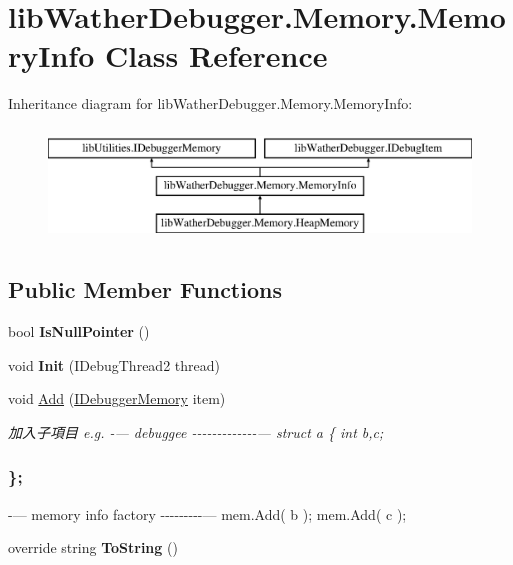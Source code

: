 \hypertarget{classlib_wather_debugger_1_1_memory_1_1_memory_info}{\section{lib\+Wather\+Debugger.\+Memory.\+Memory\+Info Class Reference}
\label{classlib_wather_debugger_1_1_memory_1_1_memory_info}
}
Inheritance diagram for lib\+Wather\+Debugger.\+Memory.\+Memory\+Info\+:\begin{figure}[H]
\begin{center}
\leavevmode
\includegraphics[height=3.000000cm]{classlib_wather_debugger_1_1_memory_1_1_memory_info}
\end{center}
\end{figure}
\subsection*{Public Member Functions}
\begin{DoxyCompactItemize}
\item 
\hypertarget{classlib_wather_debugger_1_1_memory_1_1_memory_info_a1007d1f55b8e9579928724a0fe42f52c}{bool {\bfseries Is\+Null\+Pointer} ()}\label{classlib_wather_debugger_1_1_memory_1_1_memory_info_a1007d1f55b8e9579928724a0fe42f52c}

\item 
\hypertarget{classlib_wather_debugger_1_1_memory_1_1_memory_info_a072a240dfc246a67118fc8d8c061443b}{void {\bfseries Init} (I\+Debug\+Thread2 thread)}\label{classlib_wather_debugger_1_1_memory_1_1_memory_info_a072a240dfc246a67118fc8d8c061443b}

\item 
void \hyperlink{classlib_wather_debugger_1_1_memory_1_1_memory_info_a16fe831b50184b24dccbebf2e4b19288}{Add} (\hyperlink{interfacelib_utilities_1_1_i_debugger_memory}{I\+Debugger\+Memory} item)
\begin{DoxyCompactList}\small\item\em 加入子項目 e.\+g. -\/--- debuggee -\/-\/-\/-\/-\/-\/-\/-\/-\/-\/-\/-\/-\/--- struct a \{ int b,c; \subsubsection*{\}; }

-\/--- memory info factory -\/-\/-\/-\/-\/-\/-\/-\/-\/--- mem.\+Add( b ); mem.\+Add( c ); \end{DoxyCompactList}\item 
\hypertarget{classlib_wather_debugger_1_1_memory_1_1_memory_info_a70a148d400f1cd998df214f125585a36}{override string {\bfseries To\+String} ()}\label{classlib_wather_debugger_1_1_memory_1_1_memory_info_a70a148d400f1cd998df214f125585a36}

\end{DoxyCompactItemize}
